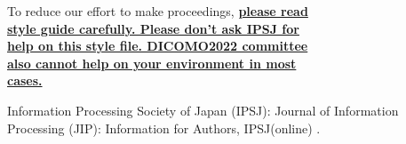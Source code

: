 \documentclass[English]{dicomopapers}
\begin{document}
To reduce our effort to make proceedings,
{\bf \underline{please read}}\\
{\bf \underline{style guide carefully. Please don't ask IPSJ for}}\\
{\bf \underline{help on this style file. DICOMO2022 committee}}\\
{\bf \underline{also cannot help on your environment in most}}\\
{\bf \underline{cases.}}

\begin{thebibliography}{99}
Information Processing Society of Japan (IPSJ): Journal of Information
Processing (JIP): Information for Authors, IPSJ(online)
.
\end{thebibliography}
\end{document}
